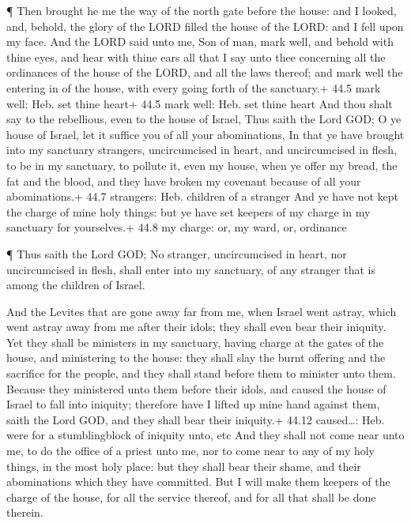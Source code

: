  ¶ Then brought he me the way of the north gate before the
house: and I looked, and, behold, the glory of the LORD filled the house
of the LORD: and I fell upon my face.  And the LORD said
unto me, Son of man, mark well, and behold with thine eyes, and hear
with thine ears all that I say unto thee concerning all the ordinances
of the house of the LORD, and all the laws thereof; and mark well the
entering in of the house, with every going forth of the sanctuary.+ 44.5
mark well: Heb. set thine heart+ 44.5 mark well: Heb. set thine heart
 And thou shalt say to the rebellious, even to the house of
Israel, Thus saith the Lord GOD; O ye house of Israel, let it suffice
you of all your abominations,  In that ye have brought into
my sanctuary strangers, uncircumcised in heart, and uncircumcised in
flesh, to be in my sanctuary, to pollute it, even my house, when ye
offer my bread, the fat and the blood, and they have broken my covenant
because of all your abominations.+ 44.7 strangers: Heb. children of a
stranger  And ye have not kept the charge of mine holy
things: but ye have set keepers of my charge in my sanctuary for
yourselves.+ 44.8 my charge: or, my ward, or, ordinance

 ¶ Thus saith the Lord GOD; No stranger, uncircumcised in
heart, nor uncircumcised in flesh, shall enter into my sanctuary, of any
stranger that is among the children of Israel.

 And the Levites that are gone away far from me, when
Israel went astray, which went astray away from me after their idols;
they shall even bear their iniquity.  Yet they shall be
ministers in my sanctuary, having charge at the gates of the house, and
ministering to the house: they shall slay the burnt offering and the
sacrifice for the people, and they shall stand before them to minister
unto them.  Because they ministered unto them before their
idols, and caused the house of Israel to fall into iniquity; therefore
have I lifted up mine hand against them, saith the Lord GOD, and they
shall bear their iniquity.+ 44.12 caused\ldots: Heb. were for a
stumblingblock of iniquity unto, etc  And they shall not
come near unto me, to do the office of a priest unto me, nor to come
near to any of my holy things, in the most holy place: but they shall
bear their shame, and their abominations which they have committed.
 But I will make them keepers of the charge of the house,
for all the service thereof, and for all that shall be done therein.

